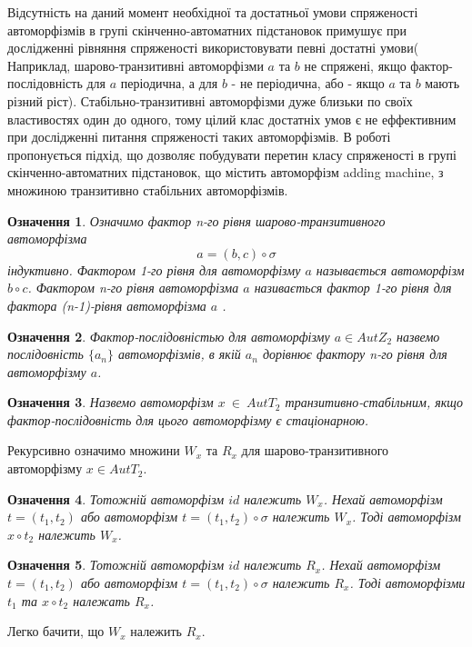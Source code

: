 \documentclass[a4paper,12pt]{article} \usepackage{a4wide}
\numberwithin{equation}{subsection}
\newtheorem{definition}{Означення}[subsection]
\begin{document}
 Відсутність на даний момент необхідної та достатньої умови
 спряженості автоморфізмів в групі скінченно-автоматних підстановок
 примушує при дослідженні рівняння спряженості використовувати певні
 достатні умови( Наприклад, шарово-транзитивні автоморфізми $a$ та $b$
 не спряжені, якщо фактор-послідовність для $a$ періодична, а для $b$
 - не періодична, або - якщо $a$ та $b$ мають різний ріст).
 Стабільно-транзитивні автоморфізми дуже близьки по своїх властивостях
 один до одного, тому цілий клас достатніх умов є не еффективним при
 дослідженні питання спряженості таких автоморфізмів. В роботі
 пропонується підхід, що дозволяє побудувати перетин класу
 спряженості в групі скінченно-автоматних підстановок, що містить
 автоморфізм adding machine, з множиною транзитивно стабільних
 автоморфізмів.
 \begin{definition}
   Означимо фактор n-го рівня шарово-транзитивного автоморфізма
   $$a=(b,c)\circ \sigma$$ індуктивно. Фактором 1-го рівня для
   автоморфізму $a$ называється автоморфізм $b\circ c$. Фактором n-го
   рівня автоморфізма $a$ називається фактор 1-го рівня для фактора
   (n-1)-рівня автоморфізма $a$ .
 \end{definition}
 \begin{definition}
   Фактор-послідовністью для автоморфізму $a\in AutZ_2$ назвемо
   послідовність $\{a_n\}$ автоморфізмів, в якій $a_n$ дорівнює
   фактору n-го рівня для автоморфізму $a$.
 \end{definition}
 \begin{definition}
   Назвемо автоморфізм $x~\in~AutT_2$ транзитивно-стабільним, якщо
   фактор-послідовність для цього автоморфізму є стаціонарною.
 \end{definition}
 Рекурсивно означимо множини $W_x$ та $R_x$ для шарово-транзитивного
 автоморфізму $x\in AutT_2$.
 \begin{definition}
   Тотожній автоморфізм $id$ належить $W_x$. Нехай автоморфізм
   $t=(t_1,t_2)$ або автоморфізм $t=(t_1,t_2)\circ \sigma$ належить
   $W_x$. Тоді автоморфізм $x\circ t_2$ належить $W_x$.
 \end{definition}
 \begin{definition}
   Тотожній автоморфізм $id$ належить $R_x$. Нехай автоморфізм
   $t=(t_1,t_2)$ або автоморфізм $t=(t_1,t_2)\circ \sigma$ належить
   $R_x$. Тоді автоморфізми $t_1$ та $x\circ t_2$ належать $R_x$.
 \end{definition}
 Легко бачити, що $W_x$ належить $R_x$.
\end{document}
